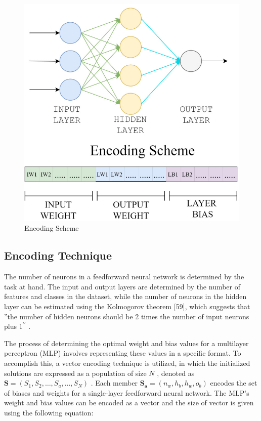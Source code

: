 \begin{figure}[htbp]
\centering
\includegraphics[width=0.8\linewidth]{images/38dcfb41c3fdbc7c64763aa9361d8c2a0f9207ab7bdf31167d2793934729fd86.jpg}
\caption{Encoding Scheme}
\label{fig:3}
\end{figure}


\subsection{Encoding Technique}

The number of neurons in a feedforward neural network is determined by the task at hand. The input and output layers are determined by the number of features and classes in the dataset, while the number of neurons in the hidden layer can be estimated using the Kolmogorov theorem [59], which suggests that ”the number of hidden neurons should be 2 times the number of input neurons plus $1^{\prime\prime}$ .

The process of determining the optimal weight and bias values for a multilayer perceptron (MLP) involves representing these values in a specific format. To accomplish this, a vector encoding technique is utilized, in which the initialized solutions are expressed as a population of size $N$ , denoted as $\boldsymbol{S}=(S_{1},S_{2},\ldots,S_{a},\ldots,S_{N})$ . Each member $\boldsymbol{S_{a}}=(n_{w},h_{b},h_{w},o_{b})$ encodes the set of biases and weights for a single-layer feedforward neural network. The MLP’s weight and bias values can be encoded as a vector and the size of vector is given using the following equation:

